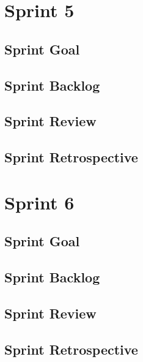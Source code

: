 \documentclass{report}
\begin{document}
    \chapter{Sprint 5}
    \section{Sprint Goal}
        
    \section{Sprint Backlog}
        
    \section{Sprint Review}
        
    \section{Sprint Retrospective}
        
        
    \chapter{Sprint 6}
    \section{Sprint Goal}
        
    \section{Sprint Backlog}
        
    \section{Sprint Review}
        
    \section{Sprint Retrospective}
        
    
    
    
    

\nocite{*} %
\end{document}
